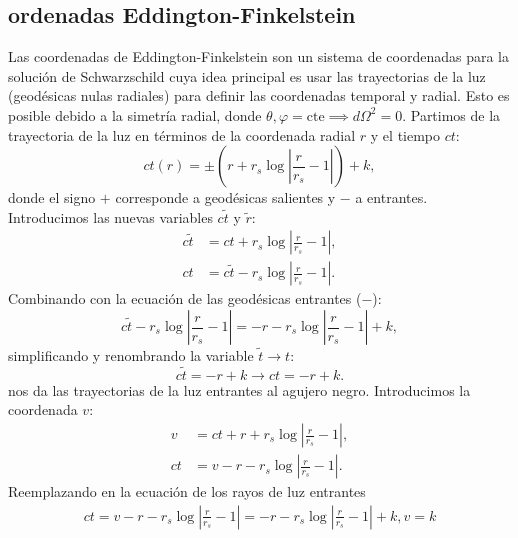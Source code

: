 \subsection{ordenadas Eddington-Finkelstein}
Las coordenadas de Eddington-Finkelstein son un sistema de coordenadas para la solución de Schwarzschild cuya idea principal es usar las trayectorias de la luz (geodésicas nulas radiales) para definir las coordenadas temporal y radial. Esto es posible debido a la simetría radial, donde \( \theta, \varphi = \text{cte} \implies d\Omega^2 = 0 \).
Partimos de la trayectoria de la luz en términos de la coordenada radial \( r \) y el tiempo \( ct \):
\begin{equation}
    ct(r) = \pm \left( r + r_s \log \left| \frac{r}{r_s} - 1 \right| \right) + k,
\end{equation}
donde el signo \( + \) corresponde a geodésicas salientes y \( - \) a entrantes. Introducimos las nuevas variables \( c\tilde{t} \) y \( \tilde{r} \):
\begin{equation}
    \begin{aligned}
        c\tilde{t} & = ct + r_s \log \left| \frac{r}{r_s} - 1 \right|,         \\
        ct         & = c\tilde{t} - r_s \log \left| \frac{r}{r_s} - 1 \right|.
    \end{aligned}
\end{equation}
Combinando con la ecuación de las geodésicas entrantes (\( - \)):
\begin{equation}
    c\tilde{t} - r_s \log \left| \frac{r}{r_s} - 1 \right| = -r - r_s \log \left| \frac{r}{r_s} - 1 \right| + k,
\end{equation}
simplificando y renombrando la variable $\tilde{t} \to t$:
\begin{equation}
    c\tilde{t} = -r + k \to ct= -r + k .
\end{equation}
nos da las trayectorias de la luz entrantes al agujero negro.
Introducimos la coordenada \( v \):
\begin{equation}
    \begin{aligned}
        v  & = ct + r + r_s \log \left| \frac{r}{r_s} - 1 \right|, \\
        ct & = v - r - r_s \log \left| \frac{r}{r_s} - 1 \right|.
    \end{aligned}
\end{equation}
Reemplazando en la ecuación de los rayos de luz entrantes
\begin{equation}
    \begin{aligned}
        ct =v - r - r_s \log \left| \frac{r}{r_s} - 1 \right|  = - r - r_s \log \left| \frac{r}{r_s} - 1 \right| + k,
        v = k
    \end{aligned}
\end{equation}
